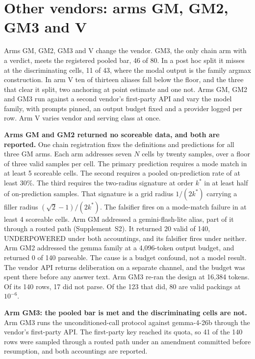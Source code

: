 \section{Other vendors: arms GM, GM2, GM3 and V}\label{sec:gm3-v}

Arms GM, GM2, GM3 and V change the vendor. GM3, the only chain arm with a verdict, meets the
registered pooled bar, 46 of 80. In a post hoc split it misses at the discriminating cells,
11 of 43, where the modal output is the family argmax construction. In arm V ten of thirteen aliases fall below the floor, and
the three that clear it split, two anchoring at point estimate and one not. Arms GM, GM2 and
GM3 run against a second vendor's first-party API and vary the model family, with prompts
pinned, an output budget fixed and a provider logged per row. Arm V varies vendor and serving
class at once.

\textbf{Arms GM and GM2 returned no scoreable data, and both are reported.} One chain
registration fixes the definitions and predictions for all three GM arms. Each arm addresses
seven $N$ cells by twenty samples, over a floor of three valid samples per cell. The primary
prediction requires a mode match in at least 5 scoreable cells. The second requires a pooled
on-prediction rate of at least 30\%. The third requires the two-radius signature at order
$k^*$ in at least half of on-prediction samples. That signature is a grid radius $1/(2k^*)$
carrying a filler radius $(\sqrt{2} - 1)/(2k^*)$. The falsifier fires on a mode-match failure
in at least 4 scoreable cells. Arm GM addressed a gemini-flash-lite alias, part of it through
a routed path (Supplement~S2). It returned 20 valid of 140, UNDERPOWERED under both
accountings, and its falsifier fires under neither. Arm GM2 addressed the gemma family at a 4,096-token output budget, and returned 0 of
140 parseable. The cause is a budget confound, not a model result. The vendor API returns
deliberation on a separate channel, and the budget was spent there before any answer text. Arm
GM3 re-ran the design at 16,384 tokens. Of its 140 rows, 17 did not parse. Of the 123
that did, 80 are valid packings at $10^{-6}$.

\textbf{Arm GM3: the pooled bar is met and the discriminating cells are not.} Arm GM3 runs the
unconditioned-call protocol against gemma-4-26b through the vendor's first-party API. The
first-party key reached its quota, so 41 of the 140
rows were sampled through a routed path under an amendment committed before resumption, and
both accountings are reported.

